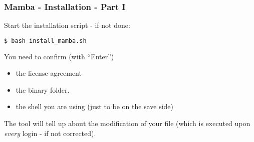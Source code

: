 \begin{frame}[fragile]
  \frametitle{Mamba - Installation - Part I}
  Start the installation script - if not done:
  \begin{lstlisting}[language=Bash, style=Shell]
$ bash install_mamba.sh
  \end{lstlisting}
  You need to confirm (with ``Enter'')
  \begin{itemize}[<+->]
  	\item the license agreement
	\item the binary folder.
	\item the shell you are using (just to be on the save side)
  \end{itemize} 
  The tool will tell up about the modification of your  file (which is executed upon \emph{every} login - if not corrected).
\end{frame}
	
